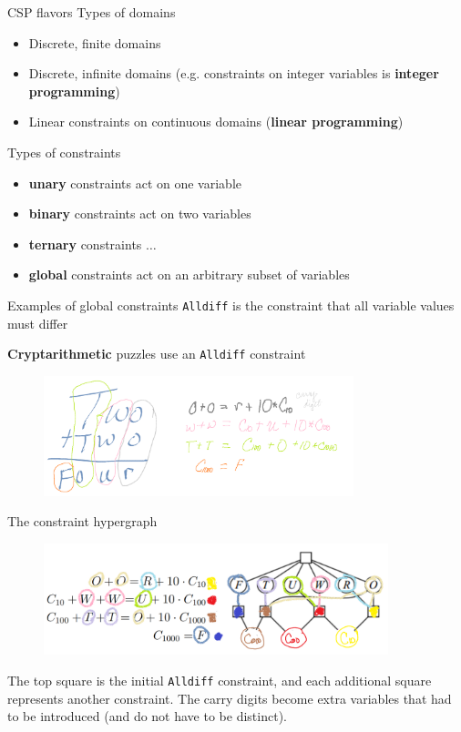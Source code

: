 \documentclass{beamer}
\begin{document}
\begin{frame}{CSP flavors}
    Types of domains
    \begin{itemize}
        \item Discrete, finite domains
        \item Discrete, infinite domains (e.g. constraints on integer variables is {\bf integer programming})
        \item Linear constraints on continuous domains ({\bf linear programming})
    \end{itemize}

    Types of constraints
    \begin{itemize}
        \item {\bf unary} constraints act on one variable
        \item {\bf binary} constraints act on two variables
        \item {\bf ternary} constraints $\dots$
        \item {\bf global} constraints act on an arbitrary subset of variables 
    \end{itemize}
    
\end{frame}

\begin{frame}{Examples of global constraints}
\texttt{Alldiff} is the constraint that all variable values must differ

\vspace{.1in}

{\bf Cryptarithmetic} puzzles use an \texttt{Alldiff} constraint
    \begin{figure}
        \includegraphics[width=9cm]{images/two_two_four.png}
    \end{figure}
\end{frame}

\begin{frame}{The constraint hypergraph}
   \begin{figure}
       \includegraphics[width=10cm]{images/constraint_hypergraph}
   \end{figure} 

   The top square is the initial \texttt{Alldiff} constraint,
   and each additional square represents another constraint. The carry 
   digits become extra variables that had to be introduced (and do not have to be 
   distinct).
\end{frame}
\end{document}
